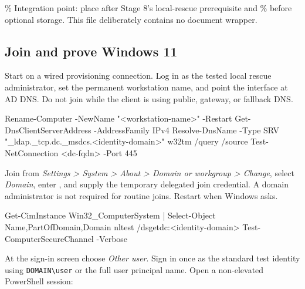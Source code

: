 \% Integration point: place after Stage 8's local-rescue prerequisite and
\% before optional storage. This file deliberately contains no document wrapper.
\subsection{Join and prove Windows 11}

Start on a wired provisioning connection. Log in as the tested local rescue
administrator, set the permanent workstation name, and point the interface at
AD DNS. Do not join while the client is using public, gateway, or fallback
DNS.

\begin{shellblock}
Rename-Computer -NewName "<workstation-name>" -Restart
Get-DnsClientServerAddress -AddressFamily IPv4
Resolve-DnsName -Type SRV "\_ldap.\_tcp.dc.\_msdcs.<identity-domain>"
w32tm /query /source
Test-NetConnection <dc-fqdn> -Port 445
\end{shellblock}


Join from \textit{Settings > System > About > Domain or workgroup > Change},
select \textit{Domain}, enter , and supply the
temporary delegated join credential. A domain administrator is not required
for routine joins. Restart when Windows asks.

\begin{shellblock}
Get-CimInstance Win32\_ComputerSystem |
  Select-Object Name,PartOfDomain,Domain
nltest /dsgetdc:<identity-domain>
Test-ComputerSecureChannel -Verbose
\end{shellblock}


At the sign-in screen choose \textit{Other user}. Sign in once as the standard
test identity using \texttt{DOMAIN\textbackslash user} or the full user
principal name. Open a non-elevated PowerShell session:


